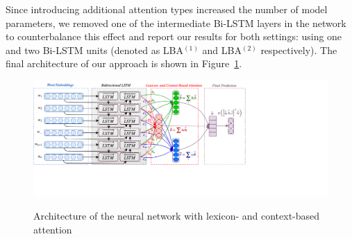 Since introducing additional attention types increased the number of
model parameters, we removed one of the intermediate Bi-LSTM layers in
the network to counterbalance this effect and report our results for
both settings: using one and two Bi-LSTM units (denoted as LBA$^{(1)}$
and LBA$^{(2)}$ respectively).  The final architecture of our approach
is shown in Figure~\ref{cgsa:fig:lba}.



\begin{figure}[htbp!]
{ \centering \includegraphics[width=1.3\linewidth]{img/lba.png} }
\caption[Neural network with lexicon-based attention]{Architecture of
  the neural network with lexicon- and context-based
  attention}\label{cgsa:fig:lba}
\end{figure}


